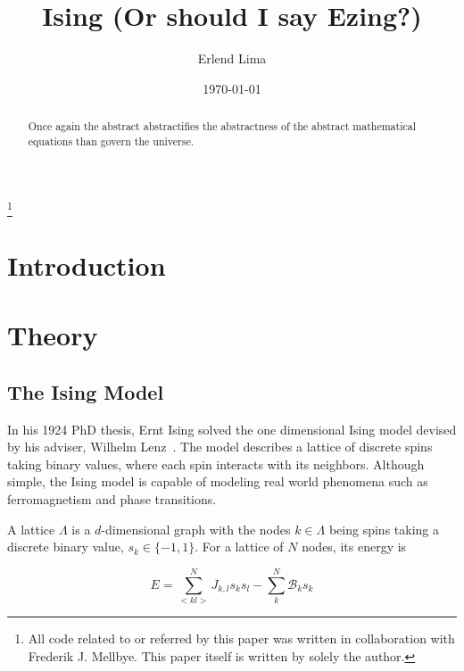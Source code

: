 \documentclass[aps,reprint]{revtex4-1}
\begin{document}
\title{Ising (Or should I say Ezing?)}
\author{Erlend Lima}
\thanks{All code related to or referred by this paper was written in
  collaboration with Frederik J. Mellbye. This paper itself is written by
 solely the author.}
\date{\today}

\begin{abstract}
Once again the abstract abstractifies the abstractness of the abstract mathematical
equations than govern the universe.
\end{abstract}
\maketitle
\tableofcontents
\makeatletter
\let\toc@pre\relax
\let\toc@post\relax
\makeatother

\newpage

\section{Introduction}
\label{sec:introduction}

\section{Theory}
\label{sec:theory}

\subsection{The Ising Model}
\label{sec:isingmodel}

In his 1924 PhD thesis, Ernt Ising 
solved the one dimensional Ising model devised by his adviser, Wilhelm Lenz~\cite{weicai}. The
model describes a lattice of discrete spins taking binary values, where each
spin interacts with its neighbors. Although simple, the Ising model is capable of modeling real
world phenomena such as ferromagnetism and phase transitions.

A lattice \(\Lambda\) is a \(d\)-dimensional graph with the nodes \(k\in\Lambda\) being spins
taking a discrete binary value, \(s_{k}\in\{-1, 1\}\). For a lattice of \(N\)
nodes, its energy is

\begin{equation}
  \label{eq:2}
 E = \sum_{<kl>}^{N}J_{k,l}s_{k}s_{l} - \sum_{k}^{N}\mathcal{B}_{k}s_{k}
\end{equation}
\end{document}
